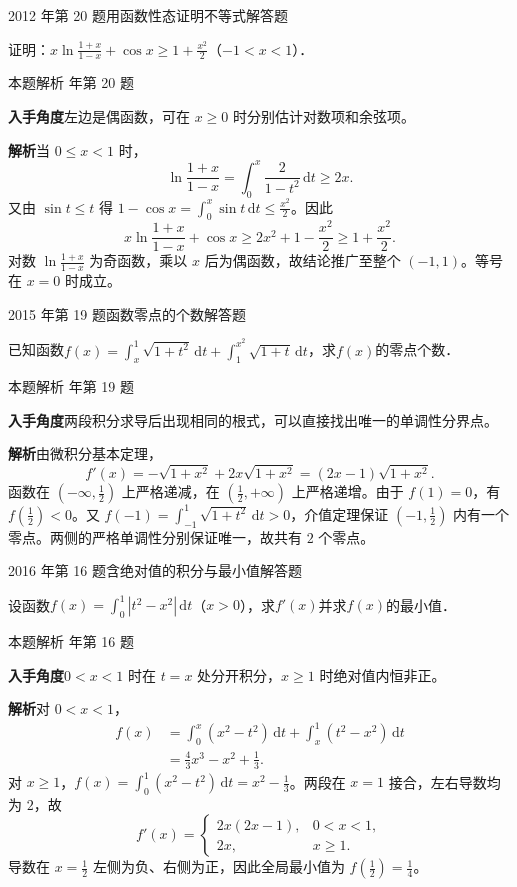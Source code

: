 \documentclass[UTF8,zihao=-4,fontset=fandol]{ctexart}
\newcommand{\QuestionPage}[6]{%
  \par\noindent\begin{minipage}{\linewidth}
  \raggedright
  {\small\textcolor{black!60}{#3\quad #5}\hfill\textcolor{accent}{#2}}\par\smallskip}
\newcommand{\QuestionEnd}{\end{minipage}\par\medskip}
\newcommand{\QuestionPage}[6]{%
  \clearpage
  {\small\textcolor{accent}{#1\hfill #2}}\par\medskip
  {\small\textcolor{black!60}{#3\quad #5\hfill #6}}\par\vspace{9bp}}
\newcommand{\QuestionEnd}{}
\newenvironment{QuestionSolution}[1]{%
  \clearpage
  {\small\textcolor{black!60}{本题解析\quad #1}}\par\medskip
}{\par\clearpage}
\begin{document}
\QuestionPage{2.6 函数性态的研究}{解答题}{2012 年第 20 题}{3}{用函数性态证明不等式}{121 / 234}
证明：$x\ln \frac{1 + x}{1 - x} + \cos x \ge 1 + \frac{x^2}{2}$（$- 1 < x < 1$）．
\QuestionEnd

\begin{QuestionSolution}{2012 年第 20 题}
\textbf{入手角度}\quad 左边是偶函数，可在 \(x\ge0\) 时分别估计对数项和余弦项。

\textbf{解析}\quad 当 \(0\le x<1\) 时，
\[
\ln\frac{1+x}{1-x}=\int_0^x\frac{2}{1-t^2}\,\mathrm{d}t\ge 2x .
\]
又由 \(\sin t\le t\) 得 \(1-\cos x=\int_0^x\sin t\,\mathrm{d}t\le \frac{x^2}{2}\)。因此
\[
x\ln\frac{1+x}{1-x}+\cos x\ge 2x^2+1-\frac{x^2}{2}
\ge 1+\frac{x^2}{2}.
\]
对数 \(\ln\frac{1+x}{1-x}\) 为奇函数，乘以 \(x\) 后为偶函数，故结论推广至整个 \((-1,1)\)。等号在 \(x=0\) 时成立。
\end{QuestionSolution}

\QuestionPage{2.6 函数性态的研究}{解答题}{2015 年第 19 题}{3}{函数零点的个数}{122 / 234}
已知函数$f(x) = \int_x^1 \sqrt{1 + t^2} \,\mathrm{d} t + \int_1^{x^2} \sqrt{1 + t} \,\mathrm{d} t$，求$f(x)$的零点个数．
\QuestionEnd

\begin{QuestionSolution}{2015 年第 19 题}
\textbf{入手角度}\quad 两段积分求导后出现相同的根式，可以直接找出唯一的单调性分界点。

\textbf{解析}\quad 由微积分基本定理，
\[
f'(x)=-\sqrt{1+x^2}+2x\sqrt{1+x^2}=(2x-1)\sqrt{1+x^2}.
\]
函数在 \((-\infty,\frac{1}{2})\) 上严格递减，在 \((\frac{1}{2},+\infty)\) 上严格递增。由于 \(f(1)=0\)，有 \(f(\frac{1}{2})<0\)。又 \(f(-1)=\int_{-1}^1\sqrt{1+t^2}\,\mathrm{d}t>0\)，介值定理保证 \((-1,\frac{1}{2})\) 内有一个零点。两侧的严格单调性分别保证唯一，故共有 \(\boxed{2}\) 个零点。
\end{QuestionSolution}

\QuestionPage{2.6 函数性态的研究}{解答题}{2016 年第 16 题}{2}{含绝对值的积分与最小值}{123 / 234}
设函数$f(x) = \int_0^1 \left| t^2 - x^2 \right|\,\mathrm{d} t$（$x > 0$），求$f'(x)$并求$f(x)$的最小值．
\QuestionEnd

\begin{QuestionSolution}{2016 年第 16 题}
\textbf{入手角度}\quad \(0<x<1\) 时在 \(t=x\) 处分开积分，\(x\ge1\) 时绝对值内恒非正。

\textbf{解析}\quad 对 \(0<x<1\)，
\[
\begin{aligned}
f(x)&=\int_0^x(x^2-t^2)\,\mathrm{d}t+\int_x^1(t^2-x^2)\,\mathrm{d}t\\
&=\frac43x^3-x^2+\frac13.
\end{aligned}
\]
对 \(x\ge1\)，\(f(x)=\int_0^1(x^2-t^2)\,\mathrm{d}t=x^2-\frac{1}{3}\)。两段在 \(x=1\) 接合，左右导数均为 \(2\)，故
\[
f'(x)=\begin{cases}
2x(2x-1),&0<x<1,\\
2x,&x\ge1.
\end{cases}
\]
导数在 \(x=\frac{1}{2}\) 左侧为负、右侧为正，因此全局最小值为 \(f(\frac{1}{2})=\boxed{\frac{1}{4}}\)。
\end{QuestionSolution}
\end{document}
